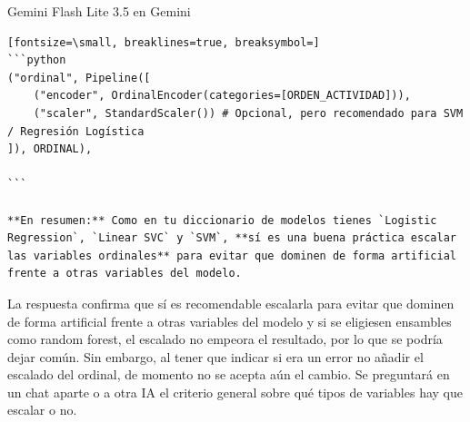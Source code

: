 \documentclass[12pt,a4paper,oneside]{book}
\begin{document}
\begin{iaresp}{Gemini Flash Lite 3.5 en Gemini}
\begin{Verbatim}[fontsize=\small, breaklines=true, breaksymbol=]
```python
("ordinal", Pipeline([
    ("encoder", OrdinalEncoder(categories=[ORDEN_ACTIVIDAD])),
    ("scaler", StandardScaler()) # Opcional, pero recomendado para SVM / Regresión Logística
]), ORDINAL),

```

**En resumen:** Como en tu diccionario de modelos tienes `Logistic Regression`, `Linear SVC` y `SVM`, **sí es una buena práctica escalar las variables ordinales** para evitar que dominen de forma artificial frente a otras variables del modelo.
\end{Verbatim}
\end{iaresp}
\begin{iaanalisis}
La respuesta confirma que sí es recomendable escalarla para evitar que dominen de forma artificial frente a otras variables del modelo y si se eligiesen ensambles como random forest, el escalado no empeora el resultado, por lo que se podría dejar común. Sin embargo, al tener que indicar si era un error no añadir el escalado del ordinal, de momento no se acepta aún el cambio. Se preguntará en un chat aparte o a otra IA el criterio general sobre qué tipos de variables hay que escalar o no.
\end{iaanalisis}
\end{document}
